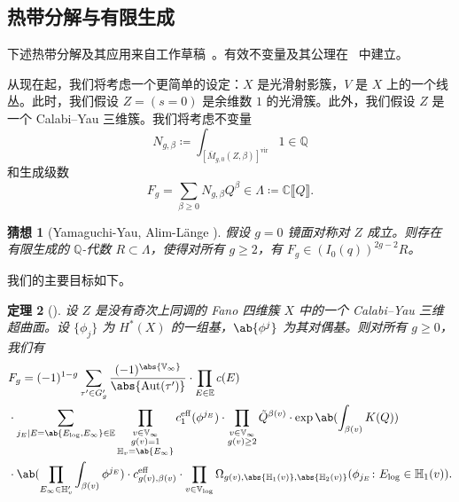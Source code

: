 \documentclass{amsart}
\newtheorem{thm}{定理}[section]
\newtheorem{conj}[thm]{猜想}
\theoremstyle{definition}
\theoremstyle{remark}
\theoremstyle{plain}
\theoremstyle{definition}
\theoremstyle{remark}
\newcommand{\C}{\mathbb{C}}
\newcommand{\Q}{\mathbb{Q}}
\newcommand{\E}{\mathbb{E}}
\newcommand{\V}{\mathbb{V}}
\renewcommand{\H}{\mathbb{H}}
\newcommand{\mr}[1]{\mathrm{#1}}
\newcommand{\on}[1]{\operatorname{#1}}
\newcommand{\1}{\mathbf{1}}
\newcommand{\2}{\mathbf{2}}
\newcommand{\3}{\mathbf{3}}
\newcommand{\vir}{\mr{vir}}
\newcommand{\ps}[1]{\llbracket #1 \rrbracket}
\DeclareMathOperator{\Aut}{Aut}
\begin{document}
\subsection{热带分解与有限生成}%
\label{sub:Tropical decomposition and finite generation}

下述热带分解及其应用来自工作草稿~\cite{CJRtropical2025}。有效不变量及其公理在~\cite{CJRpunctured} 中建立。

从现在起，我们将考虑一个更简单的设定：\(X\) 是光滑射影簇，\(V\) 是 \(X\) 上的一个线丛。此时，我们假设 \(Z = (s = 0)\) 是余维数 \(1\) 的光滑簇。此外，我们假设 \(Z\) 是一个 Calabi--Yau 三维簇。我们将考虑不变量
\[ N_{g, \beta} \coloneqq \int_{[\bar{M}_{g,0}(Z, \beta)]^{\vir}} 1 \in \Q \]
和生成级数
\[ F_g = \sum_{\beta \geq 0} N_{g, \beta} Q^{\beta} \in \Lambda \coloneqq \C \ps{Q}. \]

\begin{conj}[Yamaguchi-Yau, Alim-L\"ange {\cite{YY2004,AlimLange2007}}]
    假设 \(g=0\) 镜面对称对 \(Z\) 成立。则存在有限生成的 \(\Q\)-代数 \(R \subset \Lambda\)，使得对所有 \(g \geq 2\)，有 \(F_g \in (I_0(q))^{2g-2} R\)。
\end{conj}

我们的主要目标如下。

\begin{thm}[{\cite{CJRtropical2025}}]
    设 \(Z\) 是没有奇次上同调的 Fano 四维簇 \(X\) 中的一个 Calabi--Yau 三维超曲面。设 \(\{\phi_j\}\) 为 \(H^*(X)\) 的一组基，\(\ab\{\phi^j\}\) 为其对偶基。则对所有 \(g \geq 0\)，我们有
    \begin{align*}
        &F_g = (-1)^{1-g} \sum_{\tau' \in G_g'} \frac{(-1)^{\abs{\V_{\infty}}}}{\abs{\Aut(\tau')}} \cdot \prod_{E \in \E} c(E) \\
        & \cdot \sum_{j_E \mid E = \ab\{E_{\log}, E_{\infty}\} \in \E} \prod_{\substack{v \in \V_{\infty} \\ g(v)=1 \\ \H_v = \ab\{E_{\infty}\}}} c_1^{\mr{eff}}(\phi^{j_E}) \cdot \prod_{\substack{v \in \V_{\infty} \\ g(v) \geq 2}} \tilde{Q}^{\beta(v)} \cdot \exp \ab(\int_{\beta(v)} K(Q) )  \\
        & \cdot \ab(\prod_{E_{\infty} \in \H_v'}\int_{\beta(v)} \phi^{j_E}) \cdot c_{g(v), \beta(v)}^{\on{eff}} 
         \cdot \prod_{v \in \V_{\log}} \Omega_{g(v), \abs{\H_1(v)}, \abs{\H_2(v)}} (\phi_{j_E} \colon E_{\log} \in \H_1(v)).
    \end{align*}
\end{thm}
\end{document}
